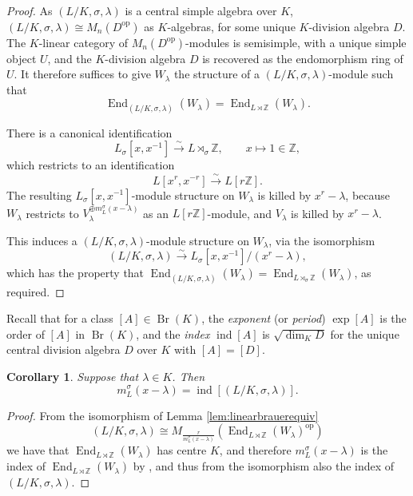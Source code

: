 \documentclass[10pt, reqno, hidelinks]{amsart}
\DeclareMathOperator{\ind}{ind}
\DeclareMathOperator{\opp}{op}
\DeclareMathOperator{\Br}{Br}
\DeclareMathOperator{\End}{End}
\newcommand{\bZ}{{\mathbb Z}}
\numberwithin{thm}{subsection}
\newtheorem{cor}[thm]{Corollary}
\theoremstyle{definition}
\begin{document}
\begin{proof}
    As $(L/K, \sigma, \lambda)$ is a central simple algebra over $K$, $(L/K, \sigma, \lambda) \cong M_n(D^{\opp})$ as $K$-algebras, for some unique $K$-division algebra $D$. The $K$-linear category of $M_n(D^{\opp})$-modules is semisimple, with a unique simple object $U$, and the $K$-division algebra $D$ is recovered as the endomorphism ring of $U$. It therefore suffices to give $W_{\lambda}$ the structure of a $(L/K,  \sigma, \lambda)$-module such that
    \[
    \End_{(L/K,  \sigma, \lambda)}(W_{\lambda}) = \End_{L \rtimes \bZ}(W_{\lambda}).
    \]
    
    There is a canonical identification
    \[
    L_\sigma[x, x^{-1}] \xrightarrow{\sim} L \rtimes_{\sigma} \bZ, \qquad x \mapsto 1 \in \bZ,
    \]
    which restricts to an identification
    \[
    L[x^r, x^{-r}] \xrightarrow{\sim} L[r \bZ].
    \]
    The resulting $L_{\sigma}[x, x^{-1}]$-module structure on $W_{\lambda}$ is killed by $x^r - \lambda$, because $W_{\lambda}$ restricts to $V_{\lambda}^{\oplus m_L^{\sigma}(x - \lambda)}$ as an $L[r \bZ]$-module, and $V_{\lambda}$ is killed by $x^r - \lambda$.

    This induces a $(L/K, \sigma,  \lambda)$-module structure on $W_{\lambda}$, via the isomorphism
    \[
    (L/K,  \sigma, \lambda) \xrightarrow{\sim} L_{\sigma}[x,x^{-1}] / (x^r - \lambda),
    \]
    which has the property that $\End_{(L/K,  \sigma,  \lambda)}(W_{\lambda}) = \End_{L \rtimes_{\sigma} \bZ}(W_{\lambda})$, as required.
\end{proof}

Recall that for a class $[A] \in \Br(K)$, the \emph{exponent} (or \emph{period}) $\exp [A]$ is the order of $[A]$ in $\Br(K)$, and the \emph{index} $\ind [A]$ is $\sqrt{\dim_K D}$ for the unique central division algebra $D$ over $K$ with $[A] = [D]$.

\begin{cor}\label{cor:cyclicindex}
    Suppose that $\lambda \in K$. Then 
    \[
    m_L^{\sigma}(x - \lambda) = \ind [(L/K, \sigma, \lambda)].
    \]
\end{cor}

\begin{proof}
From the isomorphism of Lemma \ref{lem:linearbrauerequiv}
    \[
    (L/K,  \sigma, \lambda) \cong M_{\frac{r}{m_L^{\sigma}(x-\lambda)}}(\End_{L \rtimes \bZ}(W_{\lambda})^{\opp})
    \]
    we have that $\End_{L \rtimes \bZ}(W_{\lambda})$ has centre $K$, and therefore $m_L^{\sigma}(x-\lambda)$ is the index of $\End_{L \rtimes \bZ}(W_{\lambda})$ by \cite[Prop.\ 8.29(2)]{TAYSchur}, and thus from the isomorphism also the index of $(L/K,  \sigma, \lambda)$.
\end{proof}
\end{document}
